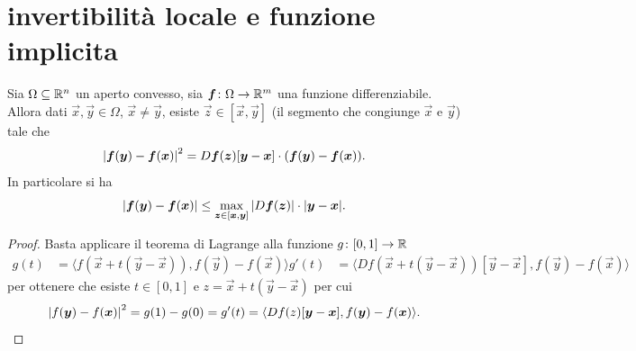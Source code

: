\section{invertibilità locale e funzione implicita}
\begin{theorem}
  \label{th:lagrange}
Sia $\Omega\subseteq {\mathbb R}^n$ un aperto convesso, 
sia $\boldsymbol f\colon \Omega\to {\mathbb R}^m$ una funzione differenziabile.
Allora dati $\vec x,\vec y \in \Omega$, $\vec x\neq \vec y$, 
esiste $\vec z \in [\vec x,\vec y]$ (il segmento che congiunge $\vec x$ e $\vec y$)
tale che 
\[
 {\left|\boldsymbol f(\boldsymbol y)- \boldsymbol f(\boldsymbol x)\right|}^2
 =  D\boldsymbol f(\boldsymbol z)[\boldsymbol y-\boldsymbol x]\cdot (\boldsymbol f(\boldsymbol y)-\boldsymbol f(\boldsymbol x)).
\]
In particolare si ha 
\[
{\left|\boldsymbol f(\boldsymbol y)- \boldsymbol f(\boldsymbol x)\right|}
\le \max_{\boldsymbol z\in [\boldsymbol x,\boldsymbol y]} {\left|D\boldsymbol f(\boldsymbol z)\right|} \cdot {\left|\boldsymbol y-\boldsymbol x\right|}.
\]
\end{theorem}
\begin{proof}
Basta applicare il teorema di Lagrange
alla funzione $g\colon[0,1]\to {\mathbb R}$
\begin{align*}
  g(t) &= \langle f(\vec x + t(\vec y-\vec x)), f(\vec y)-f(\vec x)\rangle
  g'(t) &= \langle Df(\vec x + t(\vec y - \vec x))[\vec y - \vec x], f(\vec y) - f(\vec x)\rangle
\end{align*}
per ottenere che esiste $t\in [0,1]$ e $z=\vec x + t(\vec y - \vec x)$ 
per cui
\begin{align*}
  {\left|f(\boldsymbol y) - f(\boldsymbol x)\right|}^2 
    = g(1) - g(0) = g'(t)
    = \langle Df(z)[\boldsymbol y - \boldsymbol x], f(\boldsymbol y) - f(\boldsymbol x)\rangle.
\end{align*}
\end{proof}

